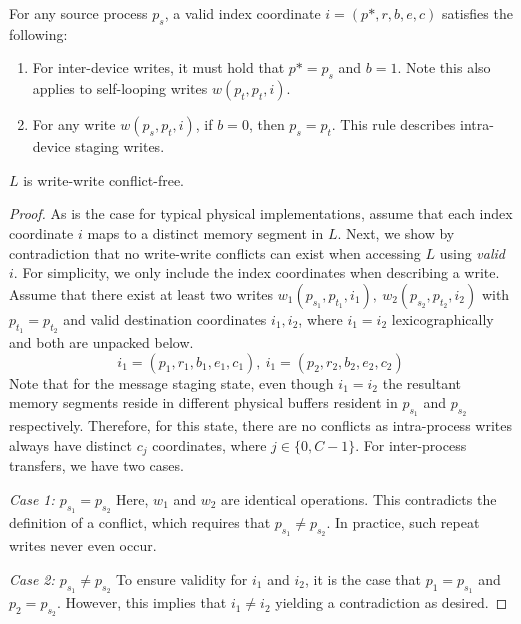 \begin{definition}
    For any source process $p_s$, a valid index coordinate $i = (p*, r, b, e, c)$ satisfies the following:
    \begin{enumerate}
        \item For inter-device writes, it must hold that $p* = p_s$ and $b = 1$.
        Note this also applies to self-looping writes $w(p_t, p_t, i)$.
        \item For any write $w(p_s, p_t, i)$, if $b = 0$, then $p_s = p_t$.
        This rule describes intra-device staging writes.
    \end{enumerate}
\end{definition}
\begin{theorem}\label{theorem:ww}
$L$ is write-write conflict-free.
\end{theorem}
\begin{proof}
    As is the case for typical physical implementations,
    assume that each index coordinate $i$ maps to a distinct memory segment in $L$.
    Next, we show by contradiction that no write-write conflicts can exist when accessing $L$ using \emph{valid} $i$.
    For simplicity, we only include the index coordinates when describing a write.
    Assume that there exist at least two writes $w_1(p_{s_1}, p_{t_1}, i_1),\>w_2(p_{s_2}, p_{t_2}, i_2)$
    with $p_{t_1} = p_{t_2}$ and valid destination coordinates
    $i_1, i_2$, where $i_1 = i_2$ lexicographically and both are unpacked below.
    \[
        i_1 = (p_1, r_1, b_1, e_1, c_1),\> i_1 = (p_2, r_2, b_2, e_2, c_2)
    \]
    Note that for the message staging state, even though $i_1 = i_2$ the resultant memory segments reside in
    different physical buffers resident in $p_{s_1}$ and $p_{s_2}$ respectively.
    Therefore, for this state, there are no conflicts as intra-process writes always have distinct $c_j$
    coordinates, where $j \in \{0, C - 1\}$.
    For inter-process transfers, we have two cases.

    \textit{Case 1: $p_{s_1} = p_{s_2}$}
    \newline Here, $w_1$ and $w_2$ are identical operations.
    This contradicts the definition of a conflict, which requires that $p_{s_1} \neq p_{s_2}$.
    In practice, such repeat writes never even occur.

    \textit{Case 2: $p_{s_1} \neq p_{s_2}$}
    \newline To ensure validity for $i_1$ and $i_2$, it is the case that $p_1 = p_{s_1}$ and $p_2 = p_{s_2}$.
    However, this implies that $i_1 \neq i_2$ yielding a contradiction as desired.
\end{proof}

